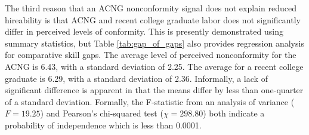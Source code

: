 \documentclass[review]{elsarticle}
\begin{document}
The third reason that an ACNG nonconformity signal does not explain reduced hireability is that ACNG
and recent college graduate labor does not significantly differ in perceived levels of conformity.
This is presently demonstrated using summary statistics, but Table \ref{tab:gap_of_gaps} also provides regression analysis for comparative skill gaps.
The average level of perceived nonconformity for the ACNG is 6.43, with a standard deviation of 2.25.
The average for a recent college graduate is 6.29, with a standard deviation of 2.36.
Informally, a lack of significant difference is apparent in that the means differ by less than one-quarter of a standard deviation.
Formally, the F-statistic from an analysis of variance ($F = 19.25$) and Pearson's chi-squared test ($\chi = 298.80$) both indicate a probability of independence which is less than 0.0001.
\end{document}
